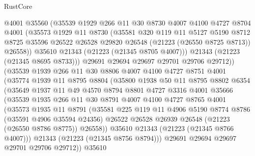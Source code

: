 \begin{lexlean}{RustCore}
\begin{coremodule}
            @4001
            @35560
            (@35539
              @1929
              @266
              @11
              @30
              @8730
              @4007
              @4100
              @4727
              @8704
              @4001
              (@35573
                @1929
                @11
                @8730
                (@35581
                  @320
                  @119
                  @11
                  @5127
                  @5190
                  @8712
                  @8725
                  @35596
                  @26522
                  @26528
                  @29820
                  @26548
                  (@21223 (@26550 @8725 @8713))
                  @26558))
              @35610
              @21343
              (@21223 (@21345 @8705 @4007)))
            @21343
            (@21223 (@21345 @8695 @8733)))
          @29691
          @29694
          @29697
          @29701
          @29706
          @29712))
      (@35539
        @1939
        @266
        @11
        @30
        @8806
        @4007
        @4100
        @4727
        @8751
        @4001
        (@35774
          @1939
          @11
          @8795
          @8804
          (@35800
            @1938
            @50
            @11
            @8795
            @8802
            @6354
            (@35649
              @1937
              @11
              @49
              @4570
              @8794
              @8801
              @4727
              @3316
              @4001
              @35666
              (@35539
                @1935
                @266
                @11
                @30
                @8791
                @4007
                @4100
                @4727
                @8765
                @4001
                (@35573
                  @1935
                  @11
                  @8791
                  (@35581
                    @225
                    @119
                    @11
                    @4906
                    @5190
                    @8774
                    @8786
                    (@35591 @4906 @35594 @24356)
                    @26522
                    @26528
                    @26939
                    @26548
                    (@21223 (@26550 @8786 @8775))
                    @26558))
                @35610
                @21343
                (@21223 (@21345 @8766 @4007)))
              @21343
              (@21223 (@21345 @8756 @8794)))
            @29691
            @29694
            @29697
            @29701
            @29706
            @29712))
        @35610

\end{coremodule}
\end{lexlean}
